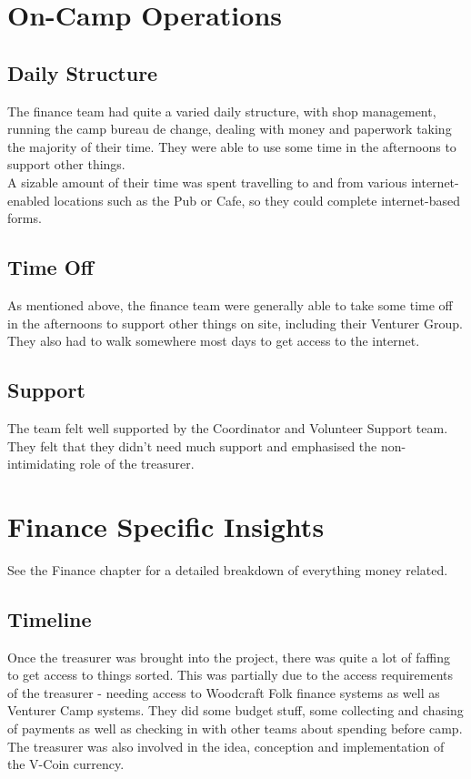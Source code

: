 \section{On-Camp Operations}
\subsection{Daily Structure}
The finance team had quite a varied daily structure, with shop management, running the camp bureau de change, dealing with money and paperwork taking the majority of their time. They were able to use some time in the afternoons to support other things.\\

A sizable amount of their time was spent travelling to and from various internet-enabled locations such as the Pub or Cafe, so they could complete internet-based forms.
\subsection{Time Off}
As mentioned above, the finance team were generally able to take some time off in the afternoons to support other things on site, including their Venturer Group. They also had to walk somewhere most days to get access to the internet. 
\subsection{Support}
The team felt well supported by the Coordinator and Volunteer Support team. They felt that they didn't need much support and emphasised the non-intimidating role of the treasurer.

\section{Finance Specific Insights}
See the Finance chapter for a detailed breakdown of everything money related.
\subsection{Timeline}
Once the treasurer was brought into the project, there was quite a lot of faffing to get access to things sorted. This was partially due to the access requirements of the treasurer - needing access to Woodcraft Folk finance systems as well as Venturer Camp systems. They did some budget stuff, some collecting and chasing of payments as well as checking in with other teams about spending before camp. The treasurer was also involved in the idea, conception and implementation of the V-Coin currency.

